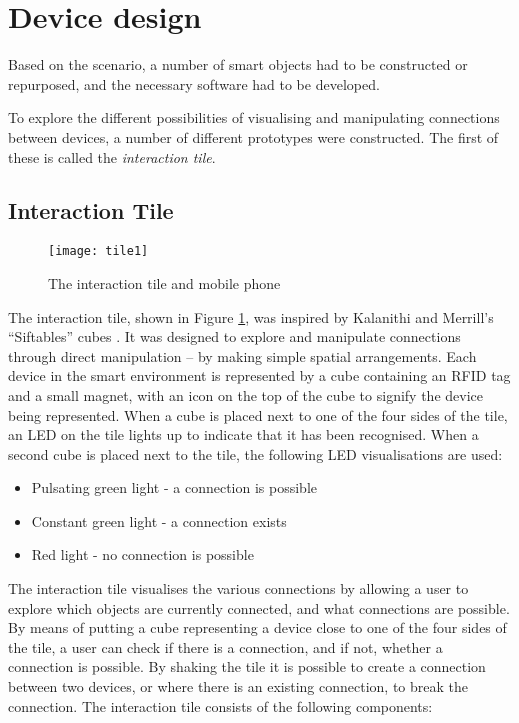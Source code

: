 \section{Device design}
\label{DeviceDesign1}

Based on the scenario, a number of smart objects had to be constructed or repurposed, and the necessary software had to be developed.

To explore the different possibilities of visualising and manipulating connections between devices, a number of different prototypes were constructed. The first of these is called the \emph{interaction tile}. 



\subsection{Interaction Tile}
\label{InteractionTile}

\begin{figure}[bth]
\centering
\texttt{[image: tile1]}
\caption{The interaction tile and mobile phone}
\label{tile1}
\end{figure}

The interaction tile, shown in Figure \ref{tile1}, was inspired by Kalanithi and Merrill's ``Siftables'' cubes \cite{Merrill2007}. It was designed to explore and manipulate connections through direct manipulation -- by making simple spatial arrangements. Each device in the smart environment is represented by a cube containing an \ac{RFID} tag and a small magnet, with an icon on the top of the cube to signify the device being represented. When a cube is placed next to one of the four sides of the tile, an LED on the tile lights up to indicate that it has been recognised. When a second cube is placed next to the tile, the following LED visualisations are used:

\begin{itemize}
	\item Pulsating green light - a connection is possible
	\item Constant green light - a connection exists
	\item Red light - no connection is possible
\end{itemize}  

The interaction tile visualises the various connections by allowing a user to explore which objects are currently connected, and what connections are possible. By means of putting a cube representing a device close to one of the four sides of the tile, a user can check if there is a connection, and if not, whether a connection is possible. By shaking the tile it is possible to create a connection between two devices, or where there is an existing connection, to break the connection. The interaction tile consists of the following components:

